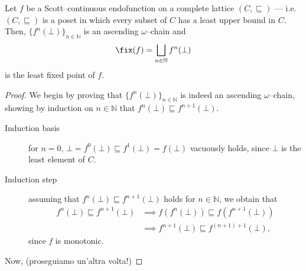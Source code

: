 \begin{thm}[Kleene]
  Let \(f\) be a Scott--continuous endofunction on a complete lattice \((C,\sqsubseteq)\) --- i.e. \((C,\sqsubseteq)\) is a poset in which every subset of \(C\) has a least upper bound in \(C\). Then, \(\lbrace f^n(\bot) \rbrace_{n \in \mathbb{N}}\) is an ascending \(\omega\)--chain and
  \begin{equation}
    \fix(f) = \bigsqcup_{n \in \mathbb{N}} f^n(\bot)
  \end{equation}
  is the least fixed point of \(f\).
\end{thm}
\begin{proof}
  We begin by proving that \(\lbrace f^n(\bot) \rbrace_{n \in \mathbb{N}}\) is indeed an ascending \(\omega\)--chain, showing by induction on \(n \in \mathbb{N}\) that \(f^n(\bot) \sqsubseteq f^{n+1}(\bot)\).
  \begin{description}
    \item[Induction basis] for \(n = 0\), \(\bot = f^0(\bot) \sqsubseteq f^1(\bot) = f(\bot)\) vacuously holds, since \(\bot\) is the least element of \(C\).
    \item[Induction step] assuming that \(f^n(\bot) \sqsubseteq f^{n+1}(\bot)\) holds for \(n \in \mathbb{N}\), we obtain that
    \begin{equation*}
      \begin{split}
        f^n(\bot) \sqsubseteq f^{n+1}(\bot) &\implies
        f(f^n(\bot)) \sqsubseteq f(f^{n+1}(\bot)) \\
        &\implies
        f^{n+1}(\bot) \sqsubseteq f^{(n+1)+1}(\bot),
      \end{split}
    \end{equation*}
    since \(f\) is monotonic.
  \end{description}
  
  Now, (proseguiamo un'altra volta!)
\end{proof}